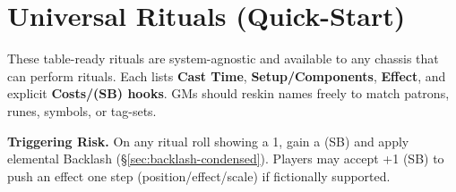 \section{Universal Rituals (Quick-Start)}\label{sec:universal-rituals}

These table-ready rituals are system-agnostic and available to any chassis that can perform rituals. Each lists \textbf{Cast Time}, \textbf{Setup/Components}, \textbf{Effect}, and explicit \textbf{Costs/(SB) hooks}. GMs should reskin names freely to match patrons, runes, symbols, or tag-sets.

\begin{tcolorbox}[title={Ritual Casting Basics},colback=gray!5,colframe=black]
\textbf{Triggering Risk.} On any ritual roll showing a 1, gain a (SB) and apply elemental Backlash (\S\ref{sec:backlash-condensed}). Players may accept +1 (SB) to push an effect one step (position/effect/scale) if fictionally supported.
\end{tcolorbox}

